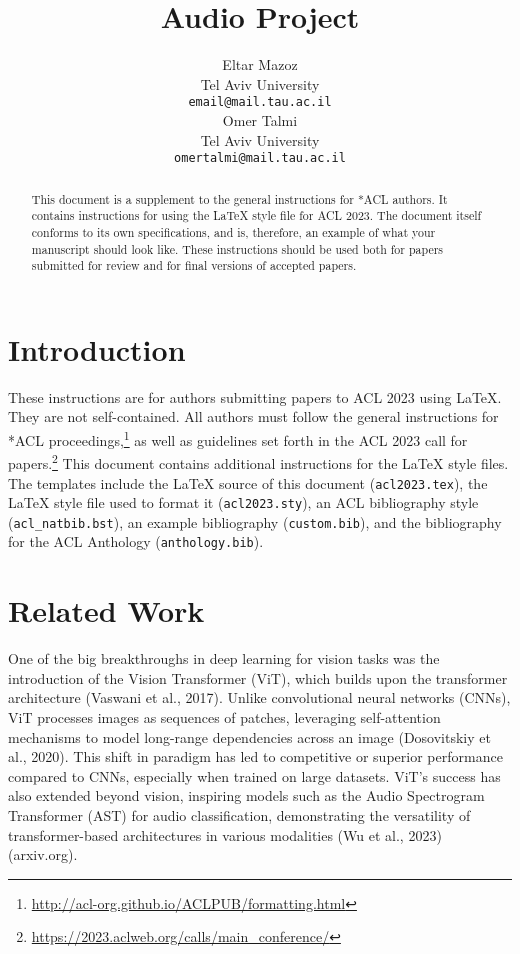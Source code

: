 \documentclass[11pt]{article}
\title{Audio Project}
\author{Eltar Mazoz \\
  Tel Aviv University \\
  \texttt{email@mail.tau.ac.il} \\\And
  Omer Talmi \\
  Tel Aviv University \\
  \texttt{omertalmi@mail.tau.ac.il} \\}
\begin{document}
\maketitle
\begin{abstract}
This document is a supplement to the general instructions for *ACL authors. It contains instructions for using the \LaTeX{} style file for ACL 2023.
The document itself conforms to its own specifications, and is, therefore, an example of what your manuscript should look like.
These instructions should be used both for papers submitted for review and for final versions of accepted papers.
\end{abstract}

\section{Introduction}

These instructions are for authors submitting papers to ACL 2023 using \LaTeX. They are not self-contained. All authors must follow the general instructions for *ACL proceedings,\footnote{\url{http://acl-org.github.io/ACLPUB/formatting.html}} as well as guidelines set forth in the ACL 2023 call for papers.\footnote{\url{https://2023.aclweb.org/calls/main_conference/}} This document contains additional instructions for the \LaTeX{} style files.
The templates include the \LaTeX{} source of this document (\texttt{acl2023.tex}),
the \LaTeX{} style file used to format it (\texttt{acl2023.sty}),
an ACL bibliography style (\texttt{acl\_natbib.bst}),
an example bibliography (\texttt{custom.bib}),
and the bibliography for the ACL Anthology (\texttt{anthology.bib}).

\section{Related Work}
One of the big breakthroughs in deep learning for vision tasks was the introduction of the Vision Transformer (ViT), which builds upon the transformer architecture (Vaswani et al., 2017). Unlike convolutional neural networks (CNNs), ViT processes images as sequences of patches, leveraging self-attention mechanisms to model long-range dependencies across an image (Dosovitskiy et al., 2020). This shift in paradigm has led to competitive or superior performance compared to CNNs, especially when trained on large datasets. ViT’s success has also extended beyond vision, inspiring models such as the Audio Spectrogram Transformer (AST) for audio classification, demonstrating the versatility of transformer-based architectures in various modalities (Wu et al., 2023) (arxiv.org).
\end{document}
